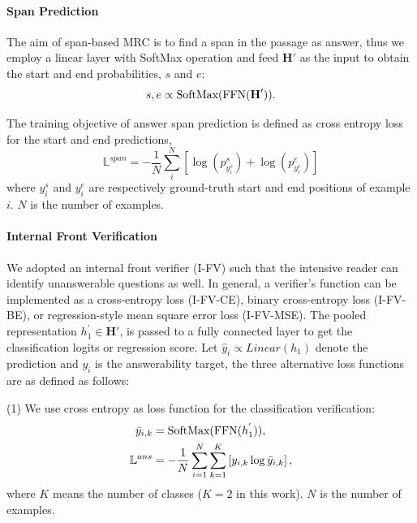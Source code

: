 \documentclass[letterpaper]{article} %
\begin{document}
\paragraph{Span Prediction}
The aim of span-based MRC is to find a span in the passage as answer, thus we employ a linear layer with SoftMax operation and feed $\textbf{H}'$ as the input to obtain the start and end probabilities, $s$ and $e$:
\begin{equation}
s, e \propto \textup{SoftMax}(\textup{FFN}(\textbf{H}')).
\end{equation}

The training objective of answer span prediction is defined as cross entropy loss for the start and end predictions,
\begin{equation}
\mathbb{L}^{span} = -\frac{1}{N}\sum_{i}^{N}[\log (p_{y^{s}_{i}}^s)+\log (p_{y^{e}_{i}}^e)]
\end{equation}
where $y^{s}_{i}$ and $y^{e}_{i}$ are respectively ground-truth start and end positions of example $i$. $N$ is the number of examples.

\paragraph{Internal Front Verification}\label{RV}
We adopted an internal front verifier (I-FV) such that the intensive reader can identify unanswerable questions as well. In general, a verifier's function can be implemented as  a cross-entropy loss (I-FV-CE), binary cross-entropy loss (I-FV-BE), or regression-style mean square error loss (I-FV-MSE). %
The pooled representation $h^{'}_{1} \in \textbf{H}'$, is passed to a fully connected layer to get the classification logits or regression score.  Let $\hat{y}_{i}  \propto \textit{Linear}(h_1)$ denote the prediction and $y_{i}$ is the answerability target, the three alternative loss functions are as defined as follows:

(1) We use cross entropy as loss function for the classification verification:
\begin{equation}
\begin{split}
\bar{y}_{i,k} &= \textup{SoftMax}(\textup{FFN}(h^{'}_{1})),\\
\mathbb{L}^{ans} &= -\frac{1}{N}\sum_{i=1}^{N}\sum_{k=1}^{K}\left [ {y}_{i,k}\log\bar{y}_{i,k} \right ],
\end{split}
\end{equation}
where $K$ means the number of classes ($K=2$ in this work). $N$ is the number of examples.
\end{document}
